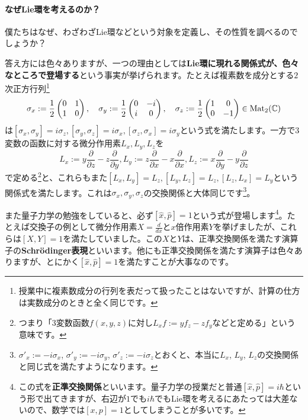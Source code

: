 \paragraph{なぜLie環を考えるのか？}

僕たちはなぜ、わざわざLie環などという対象を定義し、その性質を調べるのでしょうか？

答え方には色々ありますが、一つの理由としては\textbf{Lie環に現れる関係式が、色々なところで登場する}という事実が挙げられます。たとえば複素数を成分とする$2$次正方行列\footnote{授業中に複素数成分の行列を表だって扱ったことはないですが、計算の仕方は実数成分のときと全く同じです。}
\[
\sigma_x := 
\frac{1}{2}
\begin{pmatrix}
0 & 1 \\
1 & 0
\end{pmatrix}, \quad
\sigma_y := 
\frac{1}{2}
\begin{pmatrix}
0 & -i \\
i & 0 
\end{pmatrix}, \quad
\sigma_z := 
\frac{1}{2}
\begin{pmatrix}
1 & 0 \\
0 & -1
\end{pmatrix}
\in \operatorname{Mat}_2(\mathbb{C})
\]
は$[\sigma_x, \sigma_y] = i\sigma_z, [\sigma_y, \sigma_z] = i\sigma_x, [\sigma_z, \sigma_x] = i\sigma_y$という式を満たします。一方で$3$変数の函数に対する微分作用素$L_x, L_y, L_z$を
\[
L_x := y\frac{\partial}{\partial z} - z\frac{\partial}{\partial y}, 
L_y := z\frac{\partial}{\partial x} - x\frac{\partial}{\partial x}, 
L_z := x\frac{\partial}{\partial y} - y\frac{\partial}{\partial z}
\]
で定める\footnote{つまり「$3$変数函数$f(x, y, z)$に対し$L_x f := yf_z - zf_y$などと定める」という意味です。}と、これらもまた$[L_x, L_y] = L_z, [L_y, L_z] = L_z, [L_z, L_x] = L_y$という関係式を満たします。これは$\sigma_x, \sigma_y, \sigma_z$の交換関係と大体同じです\footnote{$\sigma'_x := -i\sigma_x$, $\sigma'_y := -i\sigma_y$, $\sigma'_z := -i\sigma_z$とおくと、本当に$L_x$, $L_y$, $L_z$の交換関係と同じ式を満たすようになります。}。

また量子力学の勉強をしていると、必ず$[\hat{x}, \hat{p}] = 1$という式が登場します\footnote{この式を\textbf{正準交換関係}といいます。量子力学の授業だと普通$[\hat{x}, \hat{p}] = i\hbar$という形で出てきますが、右辺が$1$でも$i\hbar$でもLie環を考えるにあたっては大差ないので、数学では$[x, p] = 1$としてしまうことが多いです。}。たとえば交換子の例として微分作用素$X = \frac{d}{dx}$と$x$倍作用素$Y$を挙げましたが、これらは$[X, Y] = 1$を満たしていました。この$X$と$Y$は、正準交換関係を満たす演算子の\textbf{Schr\"odinger表現}といいます。他にも正準交換関係を満たす演算子は色々ありますが、とにかく$[\hat{x}, \hat{p}] = 1$を満たすことが大事なのです。

